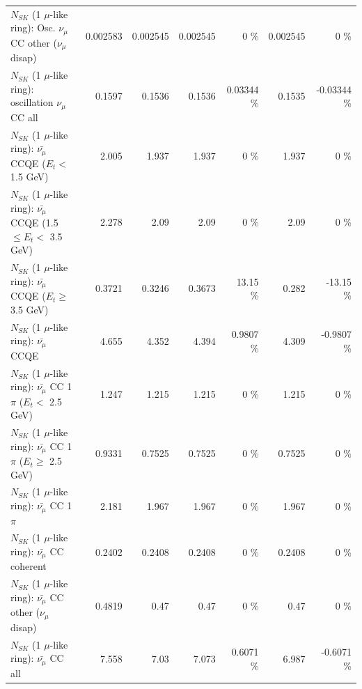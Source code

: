 \begin{table}
\begin{tabular}{| l | r | r | r  r | r  r |}
         $N_{SK}$ (1 $\mu$-like ring): Osc. $\nu_\mu$ CC other ($\nu_\mu$ disap) &        0.002583 &        0.002545 &        0.002545 &        0 \%  &        0.002545 &        0 \%  \\ 
                      $N_{SK}$ (1 $\mu$-like ring): oscillation $\nu_\mu$ CC all &          0.1597 &          0.1536 &          0.1536 &  0.03344 \%  &          0.1535 & -0.03344 \%  \\ 
\hline
\hline
          $N_{SK}$ (1 $\mu$-like ring): $\bar{\nu_\mu}$ CCQE ($E_{t} <$ 1.5 GeV) &           2.005 &           1.937 &           1.937 &        0 \%  &           1.937 &        0 \%  \\ 
 $N_{SK}$ (1 $\mu$-like ring): $\bar{\nu_\mu}$ CCQE (1.5 $\leq E_{t} <$ 3.5 GeV) &           2.278 &            2.09 &            2.09 &        0 \%  &            2.09 &        0 \%  \\ 
       $N_{SK}$ (1 $\mu$-like ring): $\bar{\nu_\mu}$ CCQE ($E_{t} \geq$ 3.5 GeV) &          0.3721 &          0.3246 &          0.3673 &    13.15 \%  &           0.282 &   -13.15 \%  \\ 
\hline
                              $N_{SK}$ (1 $\mu$-like ring): $\bar{\nu_\mu}$ CCQE &           4.655 &           4.352 &           4.394 &   0.9807 \%  &           4.309 &  -0.9807 \%  \\ 
\hline
     $N_{SK}$ (1 $\mu$-like ring): $\bar{\nu_\mu}$ CC 1$\pi$ ($E_{t} <$ 2.5 GeV) &           1.247 &           1.215 &           1.215 &        0 \%  &           1.215 &        0 \%  \\ 
  $N_{SK}$ (1 $\mu$-like ring): $\bar{\nu_\mu}$ CC 1$\pi$ ($E_{t} \geq$ 2.5 GeV) &          0.9331 &          0.7525 &          0.7525 &        0 \%  &          0.7525 &        0 \%  \\ 
\hline
                         $N_{SK}$ (1 $\mu$-like ring): $\bar{\nu_\mu}$ CC 1$\pi$ &           2.181 &           1.967 &           1.967 &        0 \%  &           1.967 &        0 \%  \\ 
                       $N_{SK}$ (1 $\mu$-like ring): $\bar{\nu_\mu}$ CC coherent &          0.2402 &          0.2408 &          0.2408 &        0 \%  &          0.2408 &        0 \%  \\ 
        $N_{SK}$ (1 $\mu$-like ring): $\bar{\nu_\mu}$ CC other ($\nu_\mu$ disap) &          0.4819 &            0.47 &            0.47 &        0 \%  &            0.47 &        0 \%  \\ 
                          $N_{SK}$ (1 $\mu$-like ring): $\bar{\nu_{\mu}}$ CC all &           7.558 &            7.03 &           7.073 &   0.6071 \%  &           6.987 &  -0.6071 \%  \\ 

\end{tabular}
\end{table}
